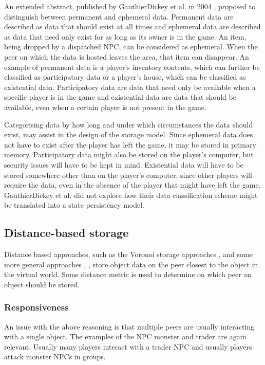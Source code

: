 An extended abstract, published by GauthierDickey et al. in 2004 \cite{hybrid_storage1}, proposed to distinguish between permanent and ephemeral data. Permanent data are described as data that should exist at all times and ephemeral data are described as data that need only exist for as long as its owner is in the game. An item, being dropped by a dispatched NPC, can be considered as ephemeral. When the peer on which the data is hosted leaves the area, that item can disappear. An example of permanent data is a player's inventory contents, which can further be classified as participatory data or a player's house, which can be classified as existential data. Participatory data are data that need only be available when a specific player is in the game and existential data are data that should be available, even when a certain player is not present in the game.

Categorising data by how long and under which circumstances the data should exist, may assist in the design of the storage model. Since ephemeral data does not have to exist after the player has left the game, it may be stored in primary memory. Participatory data might also be stored on the player's computer, but security issues will have to be kept in mind. Existential data will have to be stored somewhere other than on the player's computer, since other players will require the data, even in the absence of the player that might have left the game. GauthierDickey et al. did not explore how their data classification scheme might be translated into a state persistency model.

\subsection{Distance-based storage}
\label{distance_based_storage}

Distance based approaches, such as the Voronoi storage approaches \cite{Buyukkaya_voronoi_state_management}, \cite{Hu_voronoi_IM} and some more general approaches \cite{colyseus_distance_based}, \cite{solipsis}, store object data on the peer closest to the object in the virtual world. Some distance metric is used to determine on which peer an object should be stored.

\subsubsection{Responsiveness}

An issue with the above reasoning is that multiple peers are usually interacting with a single object. The examples of the NPC monster and trader are again relevant. Usually many players interact with a trader NPC and usually players attack monster NPCs in groups.

